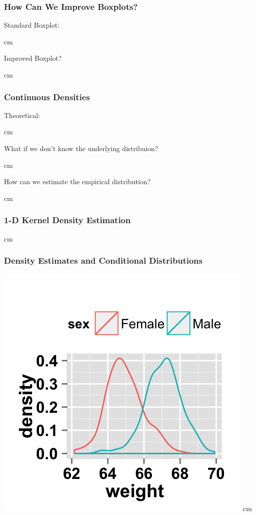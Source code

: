 \documentclass{beamer} %
\begin{document}
\begin{frame}\frametitle{How Can We Improve Boxplots?}
	\small
	Standard Boxplot:
	
	 cm
	
	Improved Boxplot?  
	
	 cm
	
\end{frame}




\begin{frame}\frametitle{Continuous Densities}
	\small
	
	Theoretical:
	
	 cm
	
	
	What if we don't know the underlying distribuion?
	
	 cm
	
	How can we estimate the empirical distribution?
	
	
	 cm
	
\end{frame}





\begin{frame}\frametitle{1-D Kernel Density Estimation}
	\small
	
	
	 cm
	
\end{frame}



\begin{frame}\frametitle{Density Estimates and Conditional Distributions}
	\includegraphics[width=0.66\linewidth]{density2.png} \hfill
	 cm
\end{frame}
\end{document}
